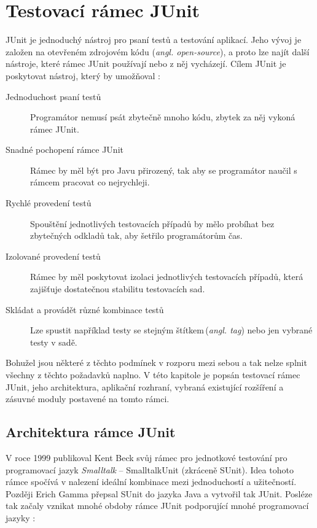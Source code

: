 \chapter{Testovací rámec JUnit}                                           %
JUnit je jednoduchý nástroj pro psaní testů a testování aplikací. Jeho vývoj je založen na otevřeném zdrojovém kódu (\emph{angl. open-source}), a proto lze najít další nástroje, které rámec JUnit používají nebo z něj vycházejí. Cílem JUnit je poskytovat nástroj, který by umožňoval :
\begin{description}
  \item[Jednoduchost psaní testů]
  Programátor nemusí psát zbytečně mnoho kódu, zbytek za něj vykoná rámec JUnit.
  \item[Snadné pochopení rámce JUnit]
  Rámec by měl být pro Javu přirozený, tak aby se programátor naučil s rámcem pracovat co nejrychleji.
  \item[Rychlé provedení testů]
  Spouštění jednotlivých testovacích případů by mělo probíhat bez zbytečných odkladů tak, aby šetřilo programátorům čas.
  \item[Izolované provedení testů]
  Rámec by měl poskytovat izolaci jednotlivých testovacích případů, která zajišťuje dostatečnou stabilitu testovacích sad.
  \item[Skládat a provádět různé kombinace testů]
  Lze spustit například testy se stejným štítkem\,(\emph{angl. tag}) nebo jen vybrané testy v sadě.
\end{description}

Bohužel jsou některé z těchto podmínek v rozporu mezi sebou a tak nelze splnit všechny z těchto požadavků naplno. V této kapitole je popsán testovací rámec JUnit, jeho architektura, aplikační rozhraní, vybraná existující rozšíření a zásuvné moduly postavené na tomto rámci. 


  \section{Architektura rámce JUnit}
  V roce 1999 publikoval Kent Beck svůj rámec pro jednotkové testování pro programovací jazyk \emph{Smalltalk} -- SmalltalkUnit (zkráceně SUnit). Idea tohoto rámce spočívá v nalezení ideální kombinace mezi jednoduchostí a užitečností. Později Erich Gamma přepsal SUnit do jazyka Java a vytvořil tak JUnit. Posléze tak začaly vznikat mnohé obdoby rámce JUnit podporující mnohé programovací jazyky \cite{UnitTestFrameworks}:
  
